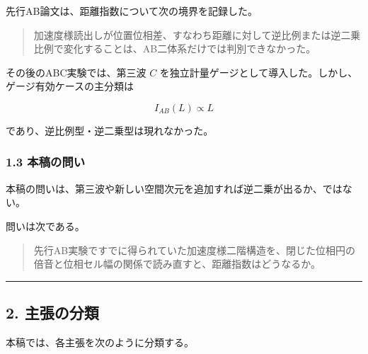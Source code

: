 \documentclass[
  a4paper,
]{ltjsarticle}
\begin{document}
先行AB論文は、距離指数について次の境界を記録した。

\begin{quote}
加速度様読出しが位置位相差、すなわち距離に対して逆比例または逆二乗比例で変化することは、AB二体系だけでは判別できなかった。
\end{quote}

その後のABC実験では、第三波 \(C\)
を独立計量ゲージとして導入した。しかし、ゲージ有効ケースの主分類は

\[
I_{AB}(L)\propto L
\]

であり、逆比例型・逆二乗型は現れなかった。

\subsubsection{1.3 本稿の問い}\label{ux672cux7a3fux306eux554fux3044}

本稿の問いは、第三波や新しい空間次元を追加すれば逆二乗が出るか、ではない。

問いは次である。

\begin{quote}
先行AB実験ですでに得られていた加速度様二階構造を、閉じた位相円の倍音と位相セル幅の関係で読み直すと、距離指数はどうなるか。
\end{quote}

\begin{center}\rule{0.5\linewidth}{0.5pt}\end{center}

\subsection{2. 主張の分類}\label{ux4e3bux5f35ux306eux5206ux985e}

本稿では、各主張を次のように分類する。
\end{document}
